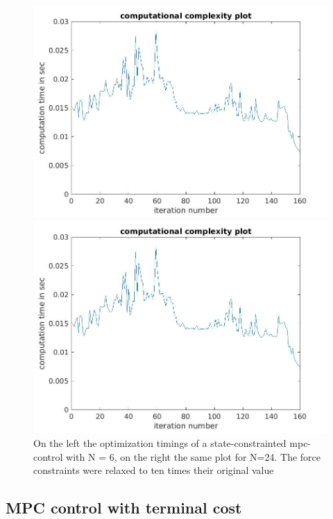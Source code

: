 \documentclass[•]{article}
\begin{document}
\begin{figure}[H]
\begin{minipage}{.45\textwidth}
\includegraphics[width = \textwidth]{comptimeforce24.jpg}
\end{minipage}
\begin{minipage}{.45\textwidth}
\includegraphics[width = \textwidth]{comptimeforce24.jpg}
\end{minipage}
\caption{On the left the optimization timings of a state-constrainted mpc-control with N = 6, on the right the same plot for N=24. The force constraints were relaxed to ten times their original value}
\end{figure}

\subsection{MPC control with terminal cost}
\end{document}
